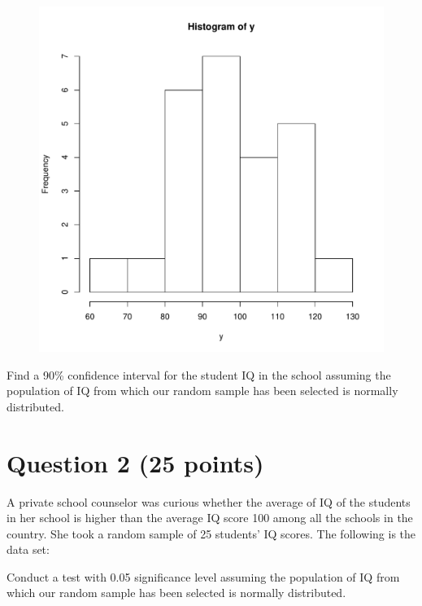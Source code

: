 \documentclass[12pt,letterpaper]{article}
\begin{document}
\begin{figure}
\includegraphics{example.pdf}
\end{figure} 

\vspace{.5cm}

\noindent Find a 90\% confidence interval for the student IQ in the school assuming the population of IQ from which our random sample has been selected is normally distributed. 

\vspace{1cm}
\section*{Question 2 (25 points)}
A private school counselor was curious  whether  the average of IQ of the students in her school is higher than the average IQ score 100 among all the schools in the country. She took a random sample of 25 students' IQ scores. The following is the data set:
\vspace{.5cm}
  
\vspace{.5cm}

\noindent Conduct a test with 0.05 significance level assuming the population of IQ from which our random sample has been selected is normally distributed. 
 
\end{document}
